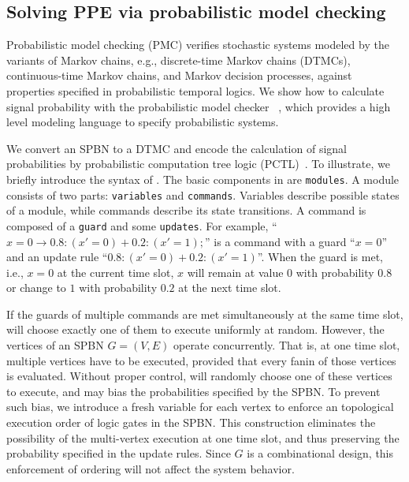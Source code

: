 \subsection{Solving PPE via probabilistic model checking}
Probabilistic model checking (PMC) verifies stochastic systems modeled by the variants of Markov chains, e.g.,
discrete-time Markov chains (DTMCs),
continuous-time Markov chains,
and Markov decision processes,
against properties specified in probabilistic temporal logics.
We show how to calculate signal probability with the probabilistic model checker \prism~\cite{Kwiatkowska2002PRISM},
which provides a high level modeling language to specify probabilistic systems.

We convert an SPBN to a DTMC and encode the calculation of signal probabilities
by probabilistic computation tree logic (PCTL)~\cite{Hansson1989}.
To illustrate, we briefly introduce the syntax of \prism.
The basic components in \prism are \texttt{modules}.
A module consists of two parts: \texttt{variables} and \texttt{commands}.
Variables describe possible states of a module,
while commands describe its state transitions.
A command is composed of a \texttt{guard} and some \texttt{updates}.
For example, ``$x=0 \rightarrow 0.8:(x'=0) + 0.2:(x'=1);$''
is a command with a guard ``$x=0$'' and an update rule ``$0.8:(x'=0) + 0.2:(x'=1)$''.
When the guard is met, i.e., $x=0$ at the current time slot,
$x$ will remain at value $0$ with probability $0.8$ or change to $1$ with probability $0.2$ at the next time slot.

If the guards of multiple commands are met simultaneously at the same time slot,
\prism will choose exactly one of them to execute uniformly at random.
However, the vertices of an SPBN $G=(V,E)$ operate concurrently.
That is, at one time slot, multiple vertices have to be executed,
provided that every fanin of those vertices is evaluated.
Without proper control, \prism will randomly choose one of these vertices to execute,
and may bias the probabilities specified by the SPBN.
To prevent such bias, we introduce a fresh variable for each vertex
to enforce an topological execution order of logic gates in the SPBN.
This construction eliminates the possibility of the multi-vertex execution at one time slot,
and thus preserving the probability specified in the update rules.
Since $G$ is a combinational design,
this enforcement of ordering will not affect the system behavior.

